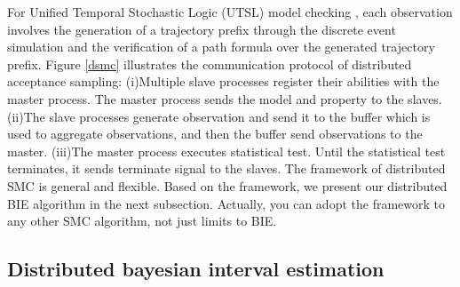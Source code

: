 \begin{figure}[htbp]
\end{figure}

For Unified Temporal Stochastic Logic (UTSL) model checking \cite{Younes2004Planning}, each observation involves the generation of a trajectory prefix through the discrete event simulation and the verification of a path formula over the generated trajectory prefix. Figure \ref{dsmc} illustrates the communication protocol of distributed acceptance sampling: (i)Multiple slave processes register their abilities with the master process. The master process sends the model and property to the slaves. (ii)The slave processes generate observation and send it to the buffer which is used to aggregate observations, and then the buffer send observations to the master. (iii)The master process executes statistical test. Until the statistical test terminates, it sends terminate signal to the slaves. The framework of distributed SMC is general and flexible. Based on the framework, we present our distributed BIE algorithm in the next subsection. Actually, you can adopt the framework to any other SMC algorithm, not just limits to BIE.

\subsection{Distributed bayesian interval estimation}

